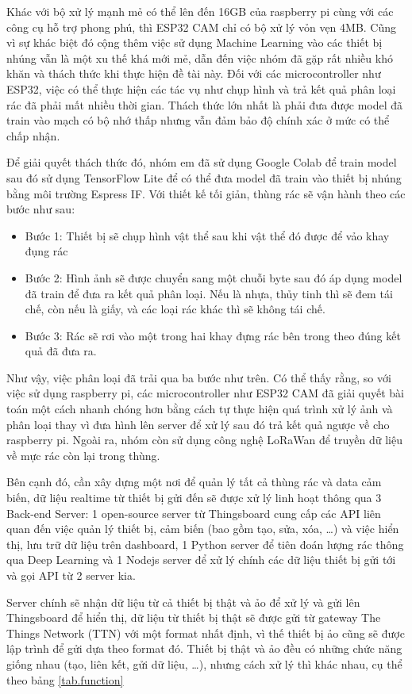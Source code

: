 Khác với bộ xử lý mạnh mẻ có thể lên đến 16GB của raspberry pi cùng với các công cụ hỗ trợ phong phú, thì ESP32 CAM chỉ có bộ xử lý vỏn vẹn 4MB.
Cũng vì sự khác biệt đó cộng thêm việc sử dụng Machine Learning vào các thiết bị nhúng vẫn là một xu thế khá mới mẻ, dẫn đến việc nhóm đã gặp rất nhiều khó khăn và thách thức khi thực hiện đề tài này.
Đối với các microcontroller như ESP32, việc có thể thực hiện các tác vụ như chụp hình và trả kết quả phân loại rác đã phải mất nhiều thời gian.
Thách thức lớn nhất là phải đưa được model đã train vào mạch có bộ nhớ thấp nhưng vẫn đảm bảo độ chính xác ở mức có thể chấp nhận. 

Để giải quyết thách thức đó, nhóm em đã sử dụng Google Colab để train model sau đó sử dụng TensorFlow Lite để có thể đưa model đã train vào thiết bị nhúng bằng môi trường Espress IF.
Với thiết kế tối giản, thùng rác sẽ vận hành theo các bước như sau: 
\begin{itemize}
    \item Bước 1: Thiết bị sẽ chụp hình vật thể sau khi vật thể đó được để vảo khay đụng rác
    \item Bước 2: Hình ảnh sẽ được chuyển sang một chuỗi byte sau đó áp dụng model đã train để đưa ra kết quả phân loại. Nếu là nhựa, thủy tinh thì sẽ đem tái chế, còn nếu là giấy, và các loại rác khác thì sẽ không tái chế.
    \item Bước 3: Rác sẽ rơi vào một trong hai khay đựng rác bên trong theo đúng kết quả đã đưa ra.
\end{itemize}
Như vậy, việc phân loại đã trải qua ba bước như trên.
Có thể thấy rằng, so với việc sử dụng raspberry pi, các microcontroller như ESP32 CAM đã giải quyết bài toán một cách nhanh chóng hơn bằng cách tự thực hiện quá trình xử lý ảnh và phân loại thay vì đưa hình lên server để xử lý sau đó trả kết quả ngược về cho raspberry pi.
Ngoài ra, nhóm còn sử dụng công nghệ LoRaWan để truyền dữ liệu về mực rác còn lại trong thùng.


Bên cạnh đó, cần xây dựng một nơi để quản lý tất cả thùng rác và data cảm biến, dữ liệu realtime từ thiết bị gửi đến sẽ được xử lý linh hoạt thông qua 3 Back-end Server: 1 open-source server từ Thingsboard cung cấp các API liên quan đến việc quản lý thiết bị, cảm biến (bao gồm tạo, sửa, xóa, …) và việc hiển thị, lưu trữ dữ liệu trên dashboard, 1 Python server để tiên đoán lượng rác thông qua Deep Learning và 1 Nodejs server để xử lý chính các dữ liệu thiết bị gửi tới và gọi API từ 2 server kia.

Server chính sẽ nhận dữ liệu từ cả thiết bị thật và ảo để xử lý và gửi lên Thingsboard để hiển thị, dữ liệu từ thiết bị thật sẽ được gửi từ gateway The Things Network (TTN) với một format nhất định, vì thế thiết bị ảo cũng sẽ được lập trình để gửi dựa theo format đó. Thiết bị thật và ảo đều có những chức năng giống nhau (tạo, liên kết, gửi dữ liệu, …), nhưng cách xử lý thì khác nhau, cụ thể theo bảng \ref{tab.function}

